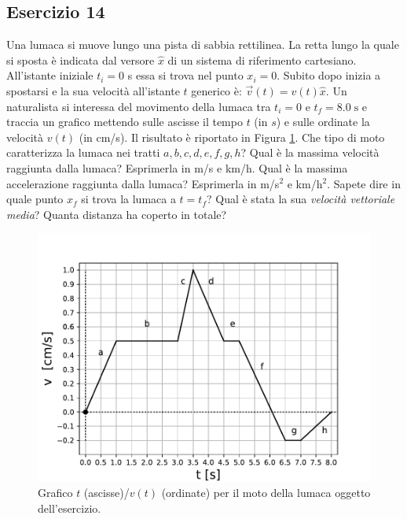 \documentclass[12pt,a4paper]{book}
\begin{document}
\subsection*{Esercizio 14}
Una lumaca si muove lungo una pista di sabbia rettilinea. La retta lungo la quale si sposta è indicata dal versore $\hat{x}$ di un sistema di riferimento cartesiano. All'istante iniziale $t_i=0$ s essa si trova nel punto $x_i=0$.  Subito dopo inizia a spostarsi e la sua velocità all'istante $t$ generico è: $\vec{v}(t)=v(t)\hat{x}$. Un naturalista si interessa del movimento della lumaca tra $t_i=0$ e $t_f=8.0\;\text{s}$ e traccia un grafico mettendo sulle ascisse il tempo $t$ (in $s$) e sulle ordinate la velocità $v(t)$ (in cm/s). Il risultato è riportato in Figura \ref{fig:lumaca}. Che tipo di moto caratterizza la lumaca nei tratti $a, b, c, d, e, f, g, h$? Qual è la massima velocità raggiunta dalla lumaca? Esprimerla in m/s e km/h. Qual è la massima accelerazione raggiunta dalla lumaca? Esprimerla in m/s$^2$ e km/h$^2$.  Sapete dire in quale punto $x_f$ si trova la lumaca a $t=t_f$? Qual è stata la sua \textit{velocità vettoriale media}? Quanta distanza ha coperto in totale?

 \begin{figure}[!ht]
 \centering
\includegraphics[scale=0.65]{lumaca.pdf}
\caption{Grafico $t$ (ascisse)/$v(t)$ (ordinate)  per il moto della lumaca oggetto dell'esercizio. \label{fig:lumaca} }
\end{figure}
\end{document}
